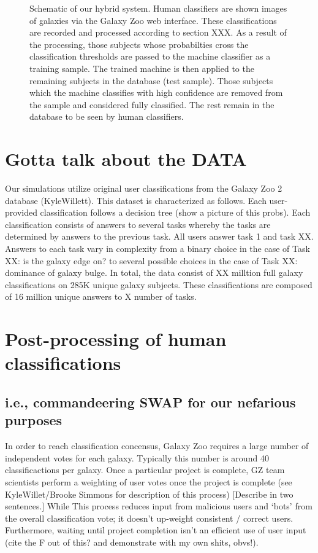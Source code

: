 \documentclass[twocolumn]{aastex6}
\begin{document}
\begin{figure*}[ht!]
\caption{Schematic of our hybrid system. Human classifiers are shown images of galaxies via the Galaxy Zoo web interface. These  classifications are recorded and processed according to section XXX. As a result of the processing, those subjects whose probabilties cross the classification thresholds are passed to the machine classifier as a training sample. The trained machine is then applied to the remaining subjects in the database (test sample). Those subjects which the machine classifies with high confidence are removed from the sample and considered fully classified. The rest remain in the database to be seen by human classifiers. \label{fig:schematic}}
\end{figure*}

\section{Gotta talk about the DATA} \label{sec:data}
Our simulations utilize original user classifications from the Galaxy Zoo 2 database (KyleWillett). This dataset is characterized as follows. 
Each user-provided classification follows a decision tree (show a picture of this probs). Each classification consists of answers to several tasks whereby the tasks are determined by answers to the previous task. All users answer task 1 and task XX. Answers to each task vary in complexity from a binary choice in the case of Task XX: is the galaxy edge on? to several possible choices in the case of Task XX: dominance of galaxy bulge. In total, the data consist of XX milltion full galaxy classifications on 285K unique galaxy subjects. These classifications are composed of 16 million unique answers to X number of tasks. 


\section{Post-processing of human classifications}
\subsection{ i.e., commandeering SWAP for our nefarious purposes}
In order to reach classification concensus, Galaxy Zoo requires a large number of independent votes for each galaxy. Typically this number is around 40 classificactions per galaxy. Once a particular project is complete, GZ team scientists perform a weighting of user votes once the project is complete (see KyleWillet/Brooke Simmons for description of this process) [Describe in two sentences.]  While This process reduces input from malicious users and `bots' from the overall classification vote; it doesn't up-weight consistent / correct users. Furthermore, waiting until project completion isn't an efficient use of user input (cite the F out of this? and demonstrate with my own shits, obvs!). 
\end{document}
